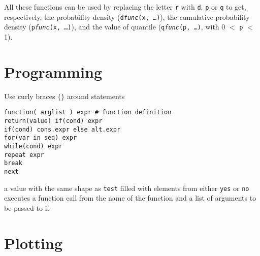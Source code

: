 All these functions can be used by replacing the letter {\tt r} with
{\tt d}, {\tt p} or {\tt q} to get, respectively, the probability
density ({\tt d{\it func}(x, \ldots)}), the cumulative probability
density ({\tt p{\it func}(x, \ldots)}), and the value of quantile
({\tt q{\it func}(p, \ldots)}, with 0 $<$ {\tt p} $<$ 1).

\section{Programming}{ Use curly braces $\lbrace\rbrace$ around statements }

{\tt function( arglist ) expr \# function definition\\ return(value) if(cond)
    expr\\ if(cond) cons.expr else  alt.expr\\ for(var in seq) expr\\
    while(cond) expr\\ repeat expr\\ break\\ next\\ }


	{a value with the same shape as {\tt test}
filled with elements from either {\tt yes} or {\tt no}}
	{executes a function call from the name of the
function and a list of arguments to be passed to it}

\section{Plotting}{}

